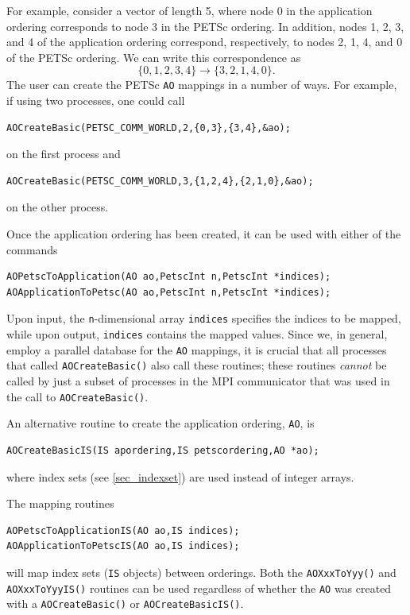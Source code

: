 For example, consider a vector of length 5, where node 0 in the application ordering
corresponds to node 3 in the PETSc ordering.  In addition, nodes 1, 2, 3, and 4 of
the application ordering correspond, respectively, to nodes 2, 1, 4, and 0 of
the PETSc ordering.
We can write this correspondence as
\[
 \{ 0, 1, 2, 3, 4 \}  \to  \{ 3, 2, 1, 4, 0 \}.
\]
The user can create the PETSc \lstinline{AO} mappings in a number of ways.  For example,
if using two processes, one could call
\begin{lstlisting}
AOCreateBasic(PETSC_COMM_WORLD,2,{0,3},{3,4},&ao);
\end{lstlisting}
on the first process and
\begin{lstlisting}
AOCreateBasic(PETSC_COMM_WORLD,3,{1,2,4},{2,1,0},&ao);
\end{lstlisting}
on the other process.

Once the application ordering has been created, it can be used
with either of the commands
\begin{lstlisting}
AOPetscToApplication(AO ao,PetscInt n,PetscInt *indices);
AOApplicationToPetsc(AO ao,PetscInt n,PetscInt *indices);
\end{lstlisting}
Upon input, the \lstinline{n}-dimensional array \lstinline{indices} specifies
the indices to be mapped, while upon output, \lstinline{indices} contains
the mapped values.
Since we, in general, employ a parallel database for the
\lstinline{AO} mappings, it is crucial that all processes that
called \lstinline{AOCreateBasic()} also call these routines; these
routines {\em cannot} be called by just a subset of processes
in the MPI communicator that was used in the call to \lstinline{AOCreateBasic()}.

An alternative routine to create the application ordering, \lstinline{AO}, is
\begin{lstlisting}
AOCreateBasicIS(IS apordering,IS petscordering,AO *ao);
\end{lstlisting}
where index sets (see \ref{sec_indexset}) are used instead of integer arrays.

The mapping routines
\begin{lstlisting}
AOPetscToApplicationIS(AO ao,IS indices);
AOApplicationToPetscIS(AO ao,IS indices);
\end{lstlisting}
will map index sets (\lstinline{IS} objects) between orderings. Both the \lstinline{AOXxxToYyy()} and
\lstinline{AOXxxToYyyIS()} routines can be used regardless of whether the \lstinline{AO} was
created with a \lstinline{AOCreateBasic()} or \break\lstinline{AOCreateBasicIS()}.

